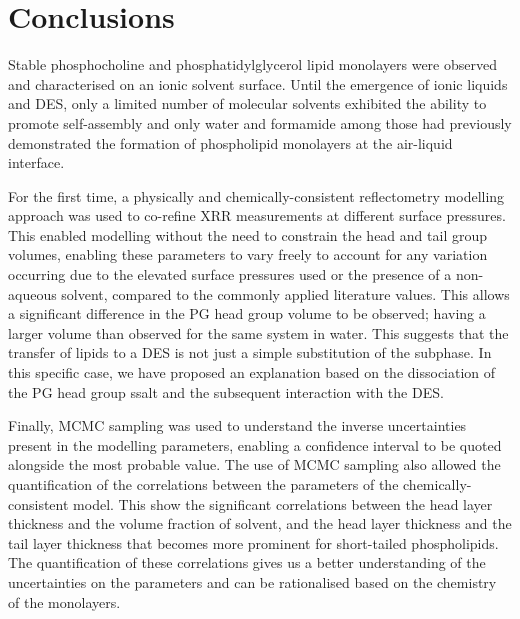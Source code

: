 \section{Conclusions}
Stable phosphocholine and phosphatidylglycerol lipid monolayers were observed and characterised on an ionic solvent surface.
Until the emergence of ionic liquids and DES, only a limited number of molecular solvents exhibited the ability to promote self-assembly and only water and formamide among those had previously demonstrated the formation of phospholipid monolayers at the air-liquid interface.

For the first time, a physically and chemically-consistent reflectometry modelling approach was used to co-refine XRR measurements at different surface pressures.
This enabled modelling without the need to constrain the head and tail group volumes, enabling these parameters to vary freely to account for any variation occurring due to the elevated surface pressures used or the presence of a non-aqueous solvent, compared to the commonly applied literature values.
This allows a significant difference in the PG head group volume to be observed; having a larger volume than observed for the same system in water.
This suggests that the transfer of lipids to a DES is not just a simple substitution of the subphase.
In this specific case, we have proposed an explanation based on the dissociation of the PG head group ssalt and the subsequent interaction with the DES.

Finally, MCMC sampling was used to understand the inverse uncertainties present in the modelling parameters, enabling a confidence interval to be quoted alongside the most probable value.
The use of MCMC sampling also allowed the quantification of the correlations between the parameters of the chemically-consistent model.
This show the significant correlations between the head layer thickness and the volume fraction of solvent, and the head layer thickness and the tail layer thickness that becomes more prominent for short-tailed phospholipids.
The quantification of these correlations gives us a better understanding of the uncertainties on the parameters and can be rationalised based on the chemistry of the monolayers.
